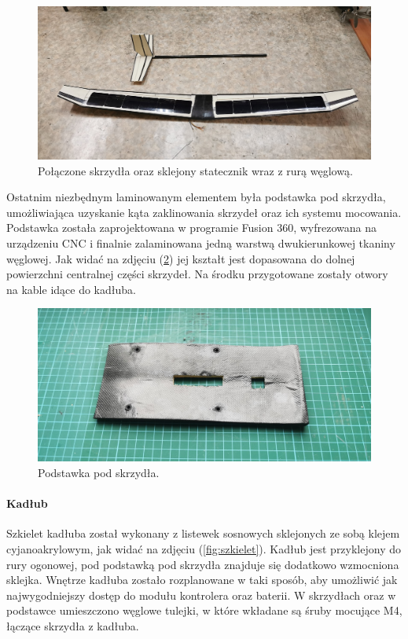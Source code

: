 \documentclass[12pt, a4paper]{article}
\let\oldref\ref
\renewcommand{\ref}[1]{(\oldref{#1})}
\begin{document}
 \begin{figure}[ht]
    \centering
    \includegraphics[width=1\textwidth]{budowa13}
    \caption{Połączone skrzydła oraz sklejony statecznik wraz z rurą węglową.}
    \label{fig:sklejone}
\end{figure}

Ostatnim niezbędnym laminowanym elementem była podstawka pod skrzydła, umożliwiająca uzyskanie kąta zaklinowania skrzydeł oraz ich systemu mocowania. Podstawka została zaprojektowana w programie Fusion 360, wyfrezowana na urządzeniu CNC i finalnie zalaminowana jedną warstwą dwukierunkowej tkaniny węglowej. Jak widać na zdjęciu \ref{fig:podstawka} jej kształt jest dopasowana do dolnej powierzchni centralnej części skrzydeł. Na środku przygotowane zostały otwory na kable idące do kadłuba.

 \begin{figure}[ht]
    \centering
    \includegraphics[width=1\textwidth]{podstawka}
    \caption{Podstawka pod skrzydła.}
    \label{fig:podstawka}
\end{figure}

\FloatBarrier
\paragraph{Kadłub}\mbox{}

Szkielet kadłuba został wykonany z listewek sosnowych sklejonych ze sobą klejem cyjanoakrylowym, jak widać na zdjęciu \ref{fig:szkielet}. Kadłub jest przyklejony do rury ogonowej, pod podstawką pod skrzydła znajduje się dodatkowo wzmocniona sklejka. Wnętrze kadłuba zostało rozplanowane w taki sposób, aby umożliwić jak najwygodniejszy dostęp do modułu kontrolera oraz baterii. W skrzydłach oraz w podstawce umieszczono węglowe tulejki, w które wkładane są śruby mocujące M4, łączące skrzydła z kadłuba. 
\end{document}
